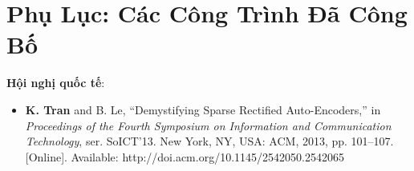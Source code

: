 \newpage
\chapter*{Phụ Lục: Các Công Trình Đã Công Bố}
\textbf{Hội nghị quốc tế}:
\begin{itemize}
	\item \textbf{K. Tran} and B. Le, ``Demystifying Sparse Rectified Auto-Encoders,'' in \emph{Proceedings of the Fourth Symposium on Information and Communication Technology}, ser. SoICT'13. New York, NY, USA: ACM, 2013, pp. 101–107. [Online]. Available: http://doi.acm.org/10.1145/2542050.2542065 
\end{itemize}
%
%
